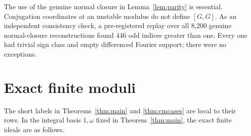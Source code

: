 \documentclass[11pt]{article}
\begin{document}
The use of the genuine normal closure in Lemma~\ref{lem:parity} is
essential.  Conjugation coordinates at an unstable modulus do not
define \([G,G]\).  As an independent consistency check, a
pre-registered replay over all 8,200 genuine normal-closure
reconstructions found 446 odd indices greater than one.  Every one
had trivial sign class and empty differenced Fourier support; there
were no exceptions.

\appendix

\section{Exact finite moduli}\label{app:moduli}

The short labels in Theorems~\ref{thm:main} and
\ref{thm:cmcases} are local to their rows.  In the integral basis
\(1,\omega\) fixed in Theorem~\ref{thm:main}, the exact finite ideals
are as follows.
\end{document}
